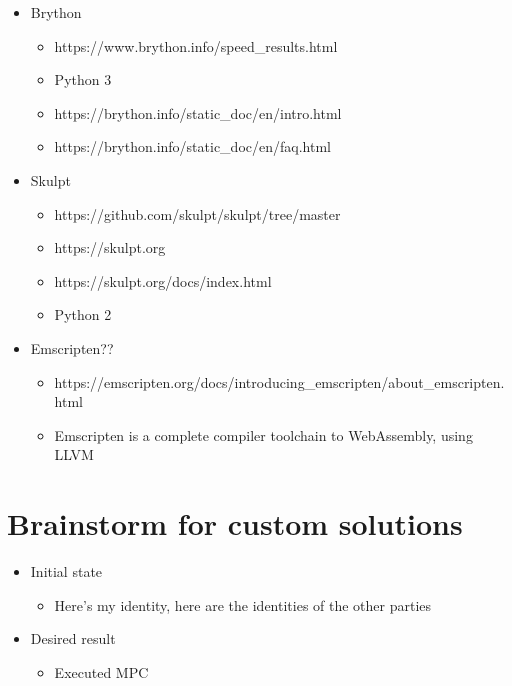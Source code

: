 \begin{itemize}
\tightlist
\item
  Brython

  \begin{itemize}
  \tightlist
  \item
    https://www.brython.info/speed\_results.html
  \item
    Python 3
  \item
    https://brython.info/static\_doc/en/intro.html
  \item
    https://brython.info/static\_doc/en/faq.html
  \end{itemize}
\item
  Skulpt

  \begin{itemize}
  \tightlist
  \item
    https://github.com/skulpt/skulpt/tree/master
  \item
    https://skulpt.org
  \item
    https://skulpt.org/docs/index.html
  \item
    Python 2
  \end{itemize}
\item
  Emscripten??

  \begin{itemize}
  \tightlist
  \item
    https://emscripten.org/docs/introducing\_emscripten/about\_emscripten.html
  \item
    Emscripten is a complete compiler toolchain to WebAssembly, using LLVM
  \end{itemize}
\end{itemize}

\label{notes__03500-brainstorm.md}
\chapter{Brainstorm for custom solutions}\label{notes__03500-brainstorm.md__brainstorm-for-custom-solutions}

\begin{itemize}
\tightlist
\item
  Initial state

  \begin{itemize}
  \tightlist
  \item
    Here's my identity, here are the identities of the other parties
  \end{itemize}
\item
  Desired result

  \begin{itemize}
  \tightlist
  \item
    Executed MPC
  \end{itemize}
\end{itemize}

